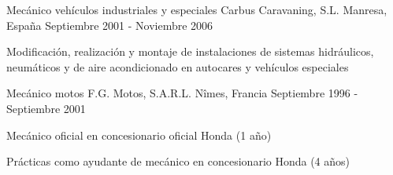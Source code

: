 \begin{cventries}
  \cventry
    {Mecánico vehículos industriales y especiales} %
    {Carbus Caravaning, S.L.} %
    {Manresa, España} %
    {Septiembre 2001 - Noviembre 2006} %
    {
      \begin{cvitems} %
        \item {Modificación, realización y montaje de instalaciones de sistemas hidráulicos, neumáticos y de aire acondicionado en autocares y vehículos especiales}
      \end{cvitems}
    }

  \cventry
    {Mecánico motos} %
    {F.G. Motos, S.A.R.L.} %
    {Nîmes, Francia} %
    {Septiembre 1996 - Septiembre 2001} %
    {
      \begin{cvitems} %
        \item {Mecánico oficial en concesionario oficial Honda (1 año)}
        \item {Prácticas como ayudante de mecánico en concesionario Honda (4 años)}
      \end{cvitems}
    }

\end{cventries}
